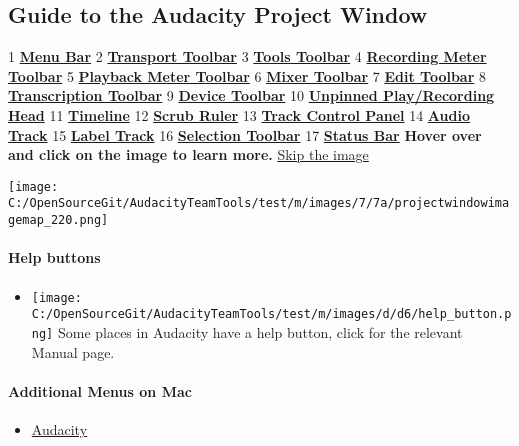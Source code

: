 \begin{multicols}{2}
\subsection{Guide to the Audacity Project Window}1\textbf{
\hyperref[\foo{manXmenuXreferenceX}]{Menu Bar}
}2\textbf{
\hyperref[\foo{manXtransportXtoolbarX}]{Transport Toolbar}
}3\textbf{
\hyperref[\foo{manXtoolsXtoolbarX}]{Tools Toolbar}
}4\textbf{
\hyperref[\foo{manXmeterXtoolbarXrecording}]{Recording Meter Toolbar}
}5\textbf{
\hyperref[\foo{manXmeterXtoolbarXplayback}]{Playback Meter Toolbar}
}6\textbf{
\hyperref[\foo{manXmixerXtoolbarX}]{Mixer Toolbar}
}7\textbf{
\hyperref[\foo{manXeditXtoolbarX}]{Edit Toolbar}
}8\textbf{
\hyperref[\foo{manXtranscriptionXtoolbarX}]{Transcription Toolbar}
}9\textbf{
\hyperref[\foo{manXdeviceXtoolbarX}]{Device Toolbar}
}10\textbf{
\hyperref[\foo{manXtimelineXpinned}]{Unpinned Play/Recording Head}
}11\textbf{
\hyperref[\foo{manXtimelineX}]{Timeline}
}12\textbf{
\hyperref[\foo{manXscrubbingXandXseekingXscrubbing}]{Scrub Ruler}
}13\textbf{
\hyperref[\foo{manXtrackXcontrolXpanelXandXverticalXscaleX}]{Track Control Panel}
}14\textbf{
\hyperref[\foo{manXaudioXtracksX}]{Audio Track}
}15\textbf{
\hyperref[\foo{manXlabelXtracksX}]{Label Track}
}16\textbf{
\hyperref[\foo{manXselectionXtoolbarX}]{Selection Toolbar}
}17\textbf{
\hyperref[\foo{manXstatusXbarX}]{Status Bar}
}\textbf{Hover over and click on the image to learn more.}
\hyperref[\foo{indexXXskiptheimage}]{Skip the image}
\par \protect\texttt{[image: C:/OpenSourceGit/AudacityTeamTools/test/m/images/7/7a/projectwindowimagemap\_220.png]}\par 
\paragraph{Help buttons}
\begin{itemize}
\item \protect\texttt{[image: C:/OpenSourceGit/AudacityTeamTools/test/m/images/d/d6/help\_button.png]} Some places in Audacity have a help button, click for the relevant Manual page.
\end{itemize}

\paragraph{Additional Menus on Mac}
\begin{itemize}
\item 
\hyperref[\foo{manXaudacityXmenuX}]{Audacity}


\end{itemize}
\end{multicols}
